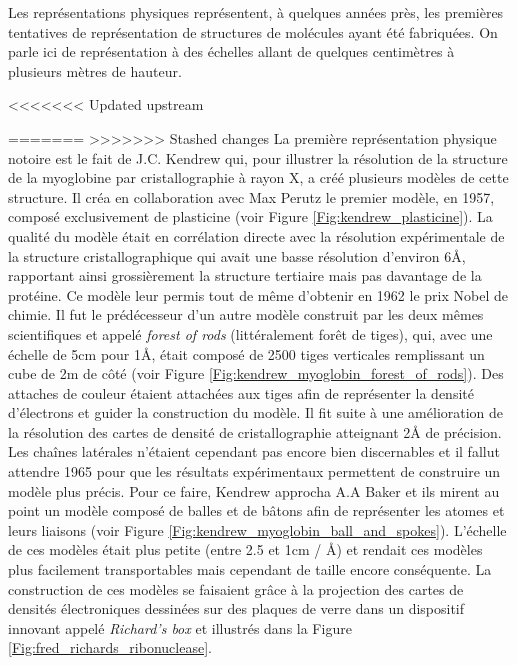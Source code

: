 
Les représentations physiques représentent, à quelques années près, les premières tentatives de représentation de structures de molécules ayant été fabriquées. On parle ici de représentation à des échelles allant de quelques centimètres à plusieurs mètres de hauteur.

<<<<<<< Updated upstream

=======
>>>>>>> Stashed changes
La première représentation physique notoire est le fait de J.C. Kendrew qui, pour illustrer la résolution de la structure de la myoglobine par cristallographie \cite{kendrew1958three} à rayon X, a créé plusieurs modèles de cette structure. Il créa en collaboration avec Max Perutz le premier modèle, en 1957, composé exclusivement de plasticine (voir Figure \ref{Fig:kendrew_plasticine}). La qualité du modèle était en corrélation directe avec la résolution expérimentale de la structure cristallographique qui avait une basse résolution d'environ 6\r{A}, rapportant ainsi grossièrement la structure tertiaire mais pas davantage de la protéine. Ce modèle leur permis tout de même d'obtenir en 1962 le prix Nobel de chimie. Il fut le prédécesseur d'un autre modèle construit par les deux mêmes scientifiques et appelé \textit{forest of rods} (littéralement forêt de tiges), qui, avec une échelle de 5cm pour 1\r{A}, était composé de 2500 tiges verticales remplissant un cube de 2m de côté (voir Figure \ref{Fig:kendrew_myoglobin_forest_of_rods}). Des attaches de couleur étaient attachées aux tiges afin de représenter la densité d'électrons et guider la construction du modèle. Il fit suite à une amélioration de la résolution des cartes de densité de cristallographie atteignant 2\r{A} de précision. Les chaînes latérales n'étaient cependant pas encore bien discernables et il fallut attendre 1965 pour que les résultats expérimentaux permettent de construire un modèle plus précis. Pour ce faire, Kendrew approcha A.A Baker et ils mirent au point un modèle composé de balles et de bâtons afin de représenter les atomes et leurs liaisons (voir Figure \ref{Fig:kendrew_myoglobin_ball_and_spokes}). L'échelle de ces modèles était plus petite (entre 2.5 et 1cm / \r{A}) et rendait ces modèles plus facilement transportables mais cependant de taille encore conséquente. La construction de ces modèles se faisaient grâce à la projection des cartes de densités électroniques dessinées sur des plaques de verre dans un dispositif innovant appelé \textit{Richard's box} et illustrés dans la Figure \ref{Fig:fred_richards_ribonuclease}.

